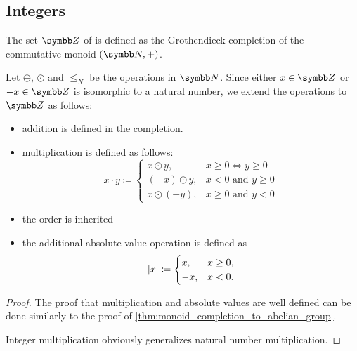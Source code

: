 \subsection{Integers}\label{subsec:integers}

\begin{definition}\label{def:integers}
  The set \( \Z \) of  is defined as the Grothendieck completion of the commutative monoid \( (\BB{N}, +) \).

  Let \( \oplus \), \( \odot \) and \( \leq_N \) be the operations in \( \BB{N} \). Since either \( x \in \Z \) or \( -x \in \Z \) is isomorphic to a natural number, we extend the operations to \( \Z \) as follows:
  \begin{itemize}
    \item addition is defined in the completion.
    \item multiplication is defined as follows:
    \begin{equation*}
      x \cdot y \coloneqq \begin{cases}
        x \odot y, & x \geq 0 \iff y \geq 0 \\
        (-x) \odot y, & x < 0 \text{ and } y \geq 0 \\
        x \odot (-y), & x \geq 0 \text{ and } y < 0
      \end{cases}
    \end{equation*}

    \item the order is inherited
    \item the additional absolute value operation is defined as
    \begin{equation*}
      \left\vert x \right\vert \coloneqq \begin{cases}
        x, &x \geq 0, \\
        -x, &x < 0.
      \end{cases}
    \end{equation*}
  \end{itemize}
\end{definition}
\begin{proof}
  The proof that multiplication and absolute values are well defined can be done similarly to the proof of \cref{thm:monoid_completion_to_abelian_group}.

  Integer multiplication obviously generalizes natural number multiplication.
\end{proof}

